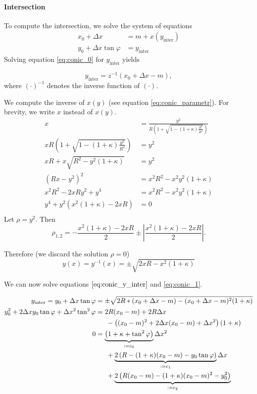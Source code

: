 \documentclass[12pt]{article}
\newcommand{\abs}[1]{\left|#1\right|}
\begin{document}
\paragraph{Intersection} To compute the intersection, we solve the system of equations
\begin{align}
  \label{eq:conic_0} x_0 + \Delta x & = m + x(y_\text{inter})\\
  \label{eq:conic_1} y_0 + \Delta x \tan\varphi & = y_\text{inter}
\end{align}
Solving equation \eqref{eq:conic_0} for $y_\text{inter}$ yields

\begin{equation}\label{eq:conic_y_inter}
  y_\text{inter} = z^{-1} (x_0 + \Delta x - m),
\end{equation}
where $(\cdot)^{-1}$ denotes the inverse function of $(\cdot)$.

We compute the inverse of $x(y)$ (see equation \eqref{eq:conic_parametr}). For brevity,
we write $x$ instead of $x(y)$.
\begin{align*}
  x & = \frac{y^2}{R \left(1 + \sqrt{1 - (1 + \kappa)\frac{y^2}{R^2}}\right)}\\
  x R \left(1 + \sqrt{1 - (1 + \kappa)\frac{y^2}{R^2}}\right) & = y^2\\
  x R + x \sqrt{R^2 - y^2(1 + \kappa)} & = y^2 \\
  \left(R x - y^2\right)^2 & = x^2 R^2 - x^2 y^2 (1 + \kappa)\\
  x^2 R^2 - 2 x R y^2 + y^4 & = x^2 R^2 - x^2 y^2 (1 + \kappa)\\
  y^4 + y^2 \left(x^2 (1 + \kappa) - 2 x R\right) &= 0\\
\end{align*}
Let $\rho = y^2$. Then
$$
  \rho_{1, 2} = - \frac{x^2 (1 + \kappa) - 2 x R}{2}
    \pm \abs{\frac{x^2 (1 + \kappa) - 2 x R}{2}}.
$$

Therefore (we discard the solution $\rho = 0$)
\begin{equation}\label{eq:conic_inv}
  y(x) = y^{-1}(x) = \pm \sqrt{2 x R - x^2(1 + \kappa)}
\end{equation}

We can now solve equations $\eqref{eq:conic_y_inter}$ and \eqref{eq:conic_1}.

\begin{align*}
  y_\text{inter} = y_0 + \Delta x \tan{\varphi} 
    & = \pm \sqrt{2R * (x_0 + \Delta x - m) - (x_0 + \Delta x - m)^2 (1 + \kappa)}\\
  y_0^2 + 2 \Delta x y_0 \tan\varphi + \Delta x^2 \tan^2\varphi
    & = 2 R (x_0 - m) + 2 R \Delta x \\ & \phantom{==} 
        - \left((x_0 - m)^2 + 2 \Delta x (x_0 - m) + \Delta x^2\right)(1 + \kappa)\\
  0 & = \underbrace{\-\left(1 + \kappa +\tan^2\varphi\right)}_{:= c_0}
        \Delta x^2 \\ & \phantom{==}
        + \underbrace{2 \left(R - (1 + \kappa)(x_0 - m) - y_0 \tan\varphi\right)}_{:=c_1} 
        \Delta x\\ &\phantom{==}
        + \underbrace{2 \left(R (x_0 - m) - (1 + \kappa)(x_0 - m)^2 - y_0^2\right)}_{:=c_2}
\end{align*}
\end{document}
